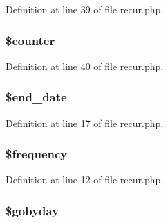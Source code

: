 \-Definition at line 39 of file recur.\-php.

\hypertarget{class_when_adc0a189fac719187ba2e6f01ca0f2466}{
\subsubsection[{\$counter}]{\setlength{\rightskip}{0pt plus 5cm}\$counter}}\label{class_when_adc0a189fac719187ba2e6f01ca0f2466}


\-Definition at line 40 of file recur.\-php.

\hypertarget{class_when_a2dc978f2a05472c5f99cc7bd2d0b5abd}{
\subsubsection[{\$end\-\_\-date}]{\setlength{\rightskip}{0pt plus 5cm}\$end\-\_\-date}}\label{class_when_a2dc978f2a05472c5f99cc7bd2d0b5abd}


\-Definition at line 17 of file recur.\-php.

\hypertarget{class_when_ad965d6d26242232a1ea5e810947ee77d}{
\subsubsection[{\$frequency}]{\setlength{\rightskip}{0pt plus 5cm}\$frequency}}\label{class_when_ad965d6d26242232a1ea5e810947ee77d}


\-Definition at line 12 of file recur.\-php.

\hypertarget{class_when_aa7c329dbfbead5deb6b8c405e0619cf2}{
\subsubsection[{\$gobyday}]{\setlength{\rightskip}{0pt plus 5cm}\$gobyday}}\label{class_when_aa7c329dbfbead5deb6b8c405e0619cf2}


